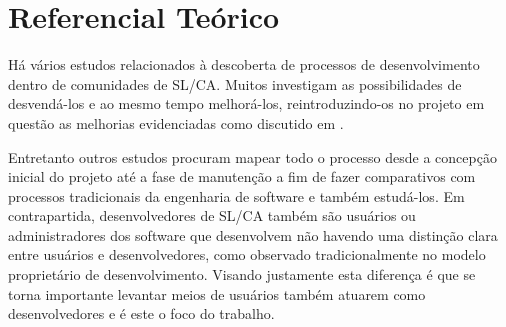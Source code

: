 % 
% 
% 
% 

\section{Referencial Teórico} \label{subsec:referencial}

Há vários estudos relacionados à descoberta de processos de desenvolvimento dentro de comunidades de SL/CA. Muitos investigam as possibilidades de desvendá-los e ao mesmo tempo melhorá-los, reintroduzindo-os no projeto em questão as melhorias evidenciadas como discutido  em \cite{experience}. 

Entretanto outros estudos procuram mapear todo o processo desde a concepção inicial do projeto até a fase de manutenção a fim de fazer comparativos com processos tradicionais da engenharia de software \cite{multimodal} e também estudá-los. 
Em contrapartida, desenvolvedores de SL/CA também são usuários ou administradores dos software que desenvolvem não havendo uma distinção clara entre usuários e desenvolvedores, como observado tradicionalmente no modelo proprietário de desenvolvimento. Visando justamente esta diferença é que se torna importante levantar meios de usuários também atuarem como desenvolvedores e é este o foco do trabalho.

